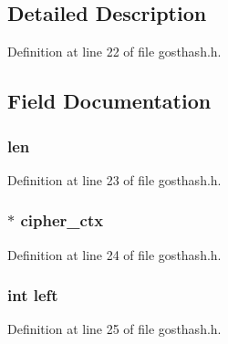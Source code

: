 \subsection{Detailed Description}


Definition at line 22 of file gosthash.\+h.



\subsection{Field Documentation}
\subsubsection[{\texorpdfstring{len}{len}}]{ len}\hypertarget{structgost__hash__ctx_ad61a1a3b4e1d86137145ae9693b1facc}{}\label{structgost__hash__ctx_ad61a1a3b4e1d86137145ae9693b1facc}


Definition at line 23 of file gosthash.\+h.

\subsubsection[{\texorpdfstring{cipher\+\_\+ctx}{cipher_ctx}}]{$\ast$ cipher\+\_\+ctx}\hypertarget{structgost__hash__ctx_a53ce32809547ccdb13c974809036a9c4}{}\label{structgost__hash__ctx_a53ce32809547ccdb13c974809036a9c4}


Definition at line 24 of file gosthash.\+h.

\subsubsection[{\texorpdfstring{left}{left}}]{\setlength{\rightskip}{0pt plus 5cm}int left}\hypertarget{structgost__hash__ctx_ad8f5e19e19f12974c9713e920ec54331}{}\label{structgost__hash__ctx_ad8f5e19e19f12974c9713e920ec54331}


Definition at line 25 of file gosthash.\+h.

